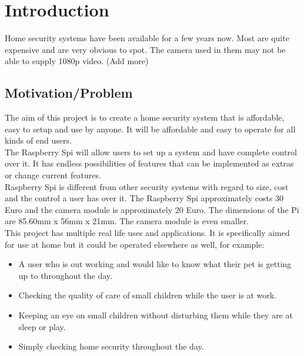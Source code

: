 \documentclass[12pt]{report}
\begin{document}
\tableofcontents
\chapter{Introduction}
\label{ch:intro} 

Home security systems have been available for a few years now. Most are quite expensive and are very obvious to spot. The camera used in them may not be able to supply 1080p video. (Add more)

\section{Motivation/Problem}
\label{sec:motprob}
The aim of this project is to create a home security system that is affordable, easy to setup and use by anyone. It will be affordable and easy to operate for all kinds of end users.\\

The Raspberry Spi will allow users to set up a system and have complete control over it. It has endless possibilities of features that can be implemented as extras or change current features.\\

Raspberry Spi is different from other security systems with regard to size, cost and the control a user has over it. The Raspberry Spi approximately costs 30 Euro and the camera module is approximately 20 Euro. The dimensions of the Pi are 85.60mm x 56mm x 21mm. The camera module is even smaller.\\

This project has multiple real life uses and applications. It is specifically aimed for use at home but it could be operated elsewhere as well, for example: \\

\begin{itemize}
  \item A user who is out working and would like to know what their pet is getting up to throughout the day.\\
  \item Checking the quality of care of small children while the user is at work.\\
  \item Keeping an eye on small children without disturbing them while they are at sleep or play.\\ 
  \item Simply checking home security throughout the day.\\  
\end{itemize}
% 
\end{document}
